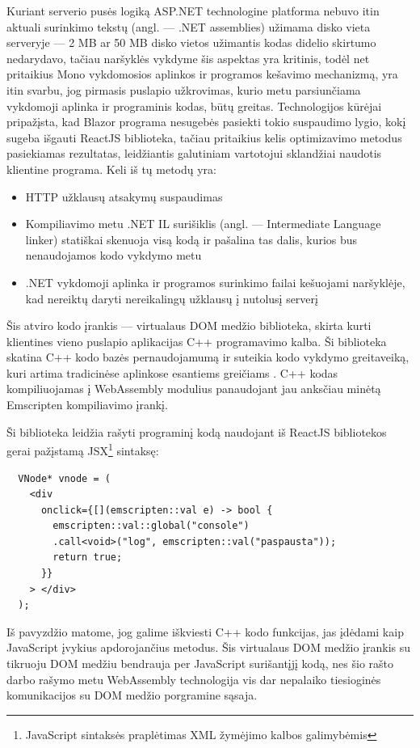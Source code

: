 \documentclass{VUMIFPSkursinis}
\begin{document}
Kuriant serverio pusės logiką ASP.NET technologine platforma nebuvo itin aktuali surinkimo tekstų (angl. — .NET assemblies) užimama disko vieta serveryje — 2 MB ar 50 MB disko vietos užimantis kodas didelio skirtumo nedarydavo, tačiau naršyklės vykdyme šis aspektas yra kritinis, todėl net pritaikius Mono vykdomosios aplinkos ir programos kešavimo mechanizmą, yra itin svarbu, jog pirmasis puslapio užkrovimas, kurio metu parsiunčiama vykdomoji aplinka ir programinis kodas, būtų greitas. Technologijos kūrėjai pripažįsta, kad Blazor programa nesugebės pasiekti tokio suspaudimo lygio, kokį sugeba išgauti ReactJS biblioteka, tačiau pritaikius kelis optimizavimo metodus pasiekiamas rezultatas, leidžiantis galutiniam vartotojui sklandžiai naudotis klientine programa. Keli iš tų metodų yra:
\begin{itemize}
    \item HTTP užklausų atsakymų suspaudimas
    \item Kompiliavimo metu .NET IL surišiklis (angl. — Intermediate Language linker) statiškai skenuoja visą kodą ir pašalina tas dalis, kurios bus nenaudojamos kodo vykdymo metu
    \item .NET vykdomoji aplinka ir programos surinkimo failai kešuojami naršyklėje, kad nereiktų daryti nereikalingų užklausų į nutolusį serverį
\end{itemize}

Šis atviro kodo įrankis — virtualaus DOM medžio biblioteka, skirta kurti klientines vieno puslapio aplikacijas C++ programavimo kalba. Ši biblioteka skatina C++ kodo bazės pernaudojamumą ir suteikia kodo vykdymo greitaveiką, kuri artima tradicinėse aplinkose esantiems greičiams \cite{ASM19}. C++ kodas kompiliuojamas į WebAssembly modulius panaudojant jau anksčiau minėtą Emscripten kompiliavimo įrankį.

Ši biblioteka leidžia rašyti programinį kodą naudojant iš ReactJS bibliotekos gerai pažįstamą JSX\footnote{JavaScript sintaksės praplėtimas XML žymėjimo kalbos galimybėmis} sintaksę:

\begin{center}
\begin{small}
\begin{verbatim}
  VNode* vnode = (
    <div
      onclick={[](emscripten::val e) -> bool {
        emscripten::val::global("console")
        .call<void>("log", emscripten::val("paspausta"));
        return true;
      }}
    > </div>
  );
\end{verbatim}
\end{small}
\end{center}
Iš pavyzdžio matome, jog galime iškviesti C++ kodo funkcijas, jas įdėdami kaip JavaScript įvykius apdorojančius metodus. Šis virtualaus DOM medžio įrankis su tikruoju DOM medžiu bendrauja per JavaScript surišantįjį kodą, nes šio rašto darbo rašymo metu WebAssembly technologija vis dar nepalaiko tiesioginės komunikacijos su DOM medžio porgramine sąsaja.
\end{document}
